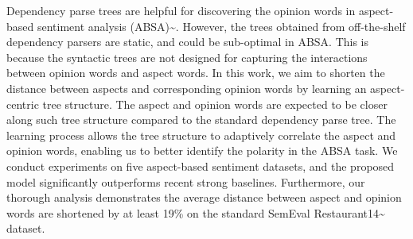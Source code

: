Dependency parse trees are helpful for discovering the opinion words in aspect-based sentiment analysis (ABSA){\textasciitilde}\cite{huang2019syntax}. However, the trees obtained from off-the-shelf dependency parsers are static, and could be sub-optimal in ABSA. This is because the syntactic trees are not designed for capturing the interactions between opinion words and aspect words. In this work, we aim to shorten the distance between aspects and corresponding opinion words by learning an aspect-centric tree structure. The aspect and opinion words are expected to be closer along such tree structure compared to the standard dependency parse tree. The learning process allows the tree structure to adaptively correlate the aspect and opinion words, enabling us to better identify the polarity in the ABSA task. We conduct experiments on five aspect-based sentiment datasets, and the proposed model significantly outperforms recent strong baselines. Furthermore, our thorough analysis demonstrates the average distance between aspect and opinion words are shortened by at least 19\% on the standard SemEval Restaurant14{\textasciitilde}\citep{Pontiki2014SemEval2014T4} dataset.
